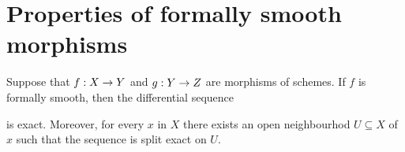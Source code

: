 \section{Properties of formally smooth morphisms}

\begin{theorem}\label{theorem:splitting_of_the_first_sequence_for_formally_smooth_morphisms}
Suppose that $f:X\rightarrow Y$ and $g:Y\rightarrow Z$ are morphisms of schemes. If $f$ is formally smooth, then the differential sequence
\begin{center}
\end{center}
is exact. Moreover, for every $x$ in $X$ there exists an open neighbourhod $U\subseteq X$ of $x$ such that the sequence is split exact on $U$.
\end{theorem}
